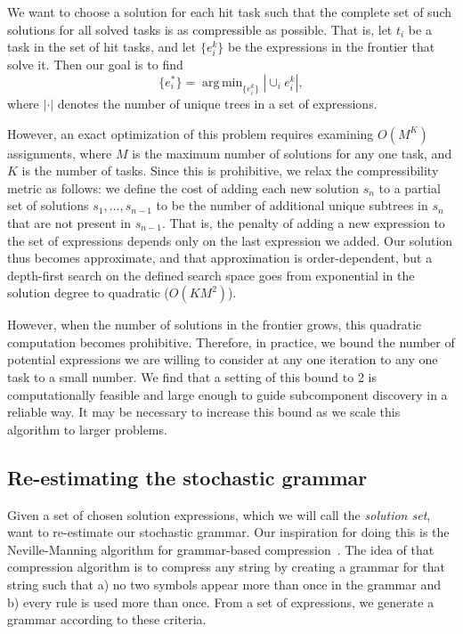 \documentclass{article}
\DeclareMathOperator*{\argmin}{arg\,min}
\begin{document}
We want to choose a solution for each hit task such that the complete set
of such solutions for all solved tasks is as compressible as
possible. That is, let $t_i$ be a task in the set of hit tasks, and
let $\{e^k_i\}$ be the expressions in the frontier that solve
it. Then our goal is to find
\[
\{e^*_i\} = \argmin_{\{e^k_i\}} | \cup_i e^k_i |,
\]
where $|\cdot|$ denotes the number of unique trees in a set of expressions.

However, an exact optimization of this problem requires examining
$O(M^K)$ assignments, where $M$ is the maximum number of solutions for
any one task, and $K$ is the number of tasks. Since this is
prohibitive, we relax the compressibility metric as follows: we define
the cost of adding each new solution $s_n$ to a partial set of
solutions $s_1, \dots, s_{n-1}$ to be the number of additional unique
subtrees in $s_n$ that are not present in $s_{n-1}$. That is, the
penalty of adding a new expression to the set of expressions depends
only on the last expression we added. Our solution thus becomes
approximate, and that approximation is order-dependent, but a
depth-first search on the defined search space goes from exponential
in the solution degree to quadratic ($O(KM^2)$). 

However, when the number of solutions in the frontier grows, this
quadratic computation becomes prohibitive. Therefore, in practice, we
bound the number of potential expressions we are willing to consider
at any one iteration to any one task to a small number. We find that a
setting of this bound to 2 is computationally feasible and large
enough to guide subcomponent discovery in a reliable way. It may be
necessary to increase this bound as we scale this algorithm to larger
problems.

\subsection{Re-estimating the stochastic grammar}

Given a set of chosen solution expressions, which we will call the
\emph{solution set}, want to re-estimate our stochastic grammar. Our
inspiration for doing this is the Neville-Manning algorithm for
grammar-based compression~\cite{nevill1997identifying}. The idea of
that compression algorithm is to compress any string by creating a
grammar for that string such that a) no two symbols appear more than
once in the grammar and b) every rule is used more than once. From a
set of expressions, we generate a grammar according to these criteria.
\end{document}
